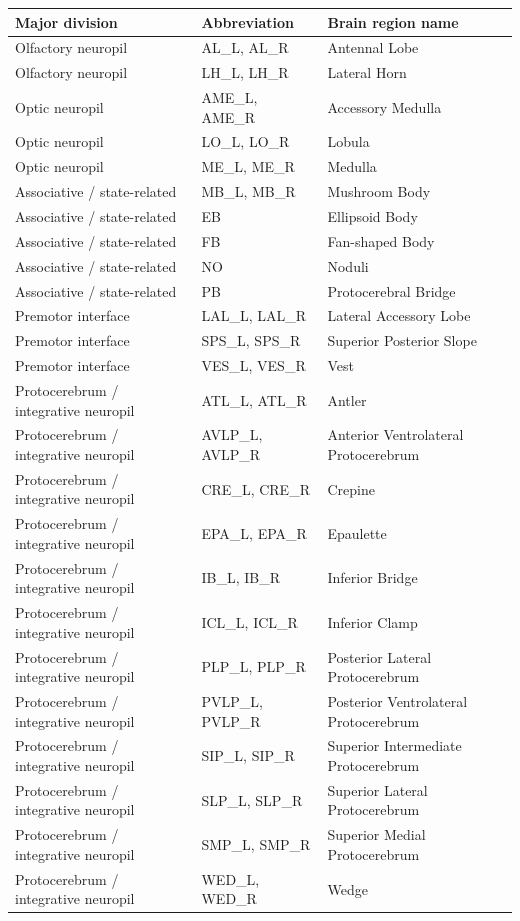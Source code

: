 \documentclass[9pt,twoside]{pnas-new}
\begin{document}
\begin{table}[h]
\centering
\small
\begin{tabular}{lll}
\hline
Major division & Abbreviation & Brain region name \\ \hline
Olfactory neuropil & AL\_L, AL\_R & Antennal Lobe \\
Olfactory neuropil & LH\_L, LH\_R & Lateral Horn \\

Optic neuropil & AME\_L, AME\_R & Accessory Medulla \\
Optic neuropil & LO\_L, LO\_R & Lobula \\
Optic neuropil & ME\_L, ME\_R & Medulla \\

Associative / state-related & MB\_L, MB\_R & Mushroom Body \\
Associative / state-related & EB & Ellipsoid Body \\
Associative / state-related & FB & Fan-shaped Body \\
Associative / state-related & NO & Noduli \\
Associative / state-related & PB & Protocerebral Bridge \\

Premotor interface & LAL\_L, LAL\_R & Lateral Accessory Lobe \\
Premotor interface & SPS\_L, SPS\_R & Superior Posterior Slope \\
Premotor interface & VES\_L, VES\_R & Vest \\

Protocerebrum / integrative neuropil & ATL\_L, ATL\_R & Antler \\
Protocerebrum / integrative neuropil & AVLP\_L, AVLP\_R & Anterior Ventrolateral Protocerebrum \\
Protocerebrum / integrative neuropil & CRE\_L, CRE\_R & Crepine \\
Protocerebrum / integrative neuropil & EPA\_L, EPA\_R & Epaulette \\
Protocerebrum / integrative neuropil & IB\_L, IB\_R & Inferior Bridge \\
Protocerebrum / integrative neuropil & ICL\_L, ICL\_R & Inferior Clamp \\
Protocerebrum / integrative neuropil & PLP\_L, PLP\_R & Posterior Lateral Protocerebrum \\
Protocerebrum / integrative neuropil & PVLP\_L, PVLP\_R & Posterior Ventrolateral Protocerebrum \\
Protocerebrum / integrative neuropil & SIP\_L, SIP\_R & Superior Intermediate Protocerebrum \\
Protocerebrum / integrative neuropil & SLP\_L, SLP\_R & Superior Lateral Protocerebrum \\
Protocerebrum / integrative neuropil & SMP\_L, SMP\_R & Superior Medial Protocerebrum \\
Protocerebrum / integrative neuropil & WED\_L, WED\_R & Wedge \\


\end{tabular}
\end{table}
\end{document}
